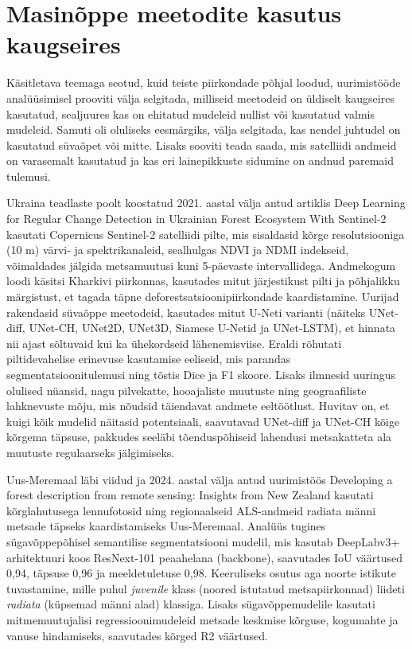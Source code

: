 \section{Masinõppe meetodite kasutus kaugseires}
Käsitletava teemaga seotud, kuid teiste piirkondade põhjal loodud, uurimistööde analüüsimisel prooviti välja selgitada, milliseid meetodeid on üldiselt kaugseires kasutatud, sealjuures kas on ehitatud mudeleid nullist või kasutatud
valmis mudeleid. Samuti oli oluliseks eesmärgiks, välja selgitada, kas nendel juhtudel on kasutatud süvaõpet või mitte. Lisaks sooviti teada saada, mis satelliidi andmeid on varasemalt kasutatud ja kas eri lainepikkuste sidumine on andnud paremaid tulemusi.

Ukraina teadlaste poolt koostatud 2021. aastal välja antud artiklis \glqq Deep Learning for Regular Change
Detection in Ukrainian Forest Ecosystem With Sentinel-2\grqq{} kasutati Copernicus Sentinel-2 satelliidi pilte, mis sisaldasid kõrge resolutsiooniga (10 m) värvi- ja spektrikanaleid, sealhulgas NDVI ja NDMI indekseid, võimaldades jälgida metsamuutusi kuni 5-päevaste intervallidega. Andmekogum loodi käsitsi Kharkivi piirkonnas, kasutades mitut järjestikust pilti ja põhjalikku märgistust, et tagada täpne deforestsatsioonipiirkondade kaardistamine. Uurijad rakendasid süvaõppe meetodeid, kasutades mitut U-Neti varianti (näiteks UNet-diff, UNet-CH, UNet2D, UNet3D, Siamese U-Netid ja UNet-LSTM), et hinnata nii ajast sõltuvaid kui ka ühekordseid lähenemisviise. Eraldi rõhutati piltidevahelise erinevuse kasutamise eeliseid, mis parandas segmentatsioonitulemusi ning tõstis Dice ja F1 skoore. Lisaks ilmnesid uuringus olulised nüansid, nagu pilvekatte, hooajaliste muutuste ning geograafiliste lahknevuste mõju, mis nõudsid täiendavat andmete eeltöötlust. Huvitav on, et kuigi kõik mudelid näitasid potentsiaali, saavutavad UNet-diff ja UNet-CH kõige kõrgema täpsuse, pakkudes seeläbi tõenduspõhiseid lahendusi metsakatteta ala muutuste regulaarseks jälgimiseks. \cite{isaienkovDeepLearningRegular2021}

Uus-Meremaal läbi viidud ja 2024. aastal välja antud uurimistöös \glqq Developing a forest description from remote sensing: Insights from
New Zealand\grqq{} kasutati kõrglahutusega lennufotosid ning regionaalseid ALS-andmeid radiata männi metsade täpseks kaardistamiseks Uus-Meremaal. Analüüs tugines sügavõppepõhisel semantilise segmentatsiooni mudelil, mis kasutab DeepLabv3+ arhitektuuri koos ResNext-101 peaahelana (backbone), saavutades IoU väärtused 0,94, täpsuse 0,96 ja meeldetuletuse 0,98. Keeruliseks osutus aga noorte istikute tuvastamine, mille puhul \textit{juvenile} klass (noored istutatud metsapiirkonnad) liideti \textit{radiata} (küpsemad männi alad) klassiga. Lisaks sügavõppemudelile kasutati mitmemuutujalisi regressioonimudeleid metsade keskmise kõrguse, kogumahte ja vanuse hindamiseks, saavutades kõrged R2 väärtused. \cite{pearseDevelopingForestDescription2025}




